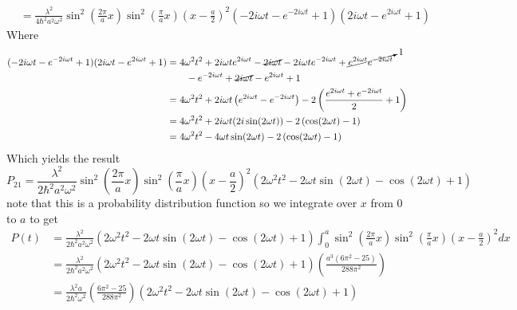 \documentclass[11pt]{article}
\numberwithin{equation}{section}
\begin{document}
\begin{enumerate}[(a)]
\begin{align*}
&= \frac{\lambda^2}{4\hbar^2a^2\omega^2}\sin^2\left(\frac{2\pi}{a}x\right)\sin^2\left(\frac{\pi}{a}x\right)\left(x-\frac{a}{2}\right)^2(-2i\omega t - e^{-2i\omega t}+1)(2i\omega t - e^{2i\omega t}+1)
\end{align*}
Where
\begin{align*}
(-2i\omega t - e^{-2i\omega t}+1)(2i\omega t - e^{2i\omega t}+1) &= 4\omega^2t^2+ 2i\omega te^{2i\omega t} - \cancel{2i\omega t} - 2i\omega te^{-2i\omega t} + \cancelto{1}{e^{2i\omega t}e^{-2i\omega t}}\\
&\ \ \ \ \ \ -e^{-2i\omega t} + \cancel{2i\omega t} - e^{2i\omega t} + 1\\
&= 4\omega^2t^2+ 2i\omega t\left(e^{2i\omega t} - e^{-2i\omega t}\right) - 2\left(\frac{e^{2i\omega t} + e^{-2i\omega t}}{2} + 1\right)\\
&= 4\omega^2t^2+ 2i\omega t(2i\sin(2\omega t)) - 2\left(\cos(2\omega t) - 1\right)\\
&= 4\omega^2t^2 - 4\omega t\sin(2\omega t) - 2\left(\cos(2\omega t) - 1\right)
\end{align*}
Which yields the result
$$P_{21} = \frac{\lambda^2}{2\hbar^2a^2\omega^2}\sin^2\left(\frac{2\pi}{a}x\right)\sin^2\left(\frac{\pi}{a}x\right)\left(x-\frac{a}{2}\right)^2 (2\omega^2t^2 - 2\omega t\sin(2\omega t) - \cos(2\omega t) + 1)$$
note that this is a probability distribution function so we integrate over $x$ from $0$ to $a$ to get
\begin{align*}
P(t) &= \frac{\lambda^2}{2\hbar^2a^2\omega^2}(2\omega^2t^2 - 2\omega t\sin(2\omega t) - \cos(2\omega t) + 1)\int_0^a\sin^2\left(\frac{2\pi}{a}x\right)\sin^2\left(\frac{\pi}{a}x\right)\left(x-\frac{a}{2}\right)^2dx \\
&= \frac{\lambda^2}{2\hbar^2a^2\omega^2}(2\omega^2t^2 - 2\omega t\sin(2\omega t) - \cos(2\omega t) + 1)\left(\frac{a^3(6\pi^2-25)}{288\pi^2}\right)\\
&= \frac{\lambda^2a}{2\hbar^2\omega^2}\left(\frac{6\pi^2-25}{288\pi^2}\right)(2\omega^2t^2 - 2\omega t\sin(2\omega t) - \cos(2\omega t) + 1)
\end{align*}


\end{enumerate}
\end{document}
